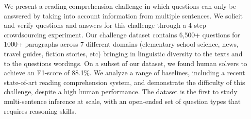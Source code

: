 We present a reading comprehension challenge in which questions can only be answered by taking into account information from multiple sentences. We solicit and verify questions and answers for this challenge through a 4-step crowdsourcing experiment. Our challenge dataset contains 6,500+ questions for 1000+ paragraphs across 7 different domains (elementary school science, news, travel guides, fiction stories, etc) bringing in linguistic diversity to the texts and to the questions wordings. On a subset of our dataset, we found human solvers to achieve an F1-score of 88.1\%. We analyze a range of baselines, including a recent state-of-art reading comprehension system, and demonstrate the difficulty of this challenge, despite a high human performance. The dataset is the first to study multi-sentence inference at scale, with an open-ended set of question types that requires reasoning skills.
